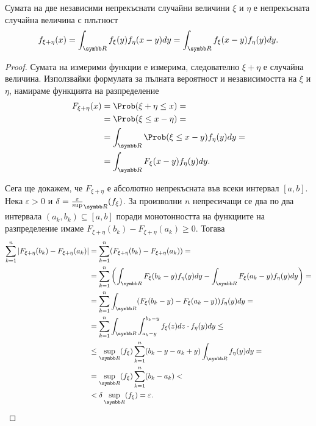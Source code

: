 \documentclass[
  headings=standardclasses,
  bibliography=totocnumbered,
]{scrartcl}
\begin{document}
\begin{proposition}\label{thm:density_of_sum_is_convolution}
  Сумата на две независими непрекъснати случайни величини \( \xi \) и \( \eta \) е непрекъсната случайна величина с плътност
  \begin{equation*}
    f_{\xi + \eta} (x)
    =
    \int_{\R} f_\xi(y) f_\eta(x - y) dy
    =
    \int_{\R} f_\xi(x - y) f_\eta(y) dy.
  \end{equation*}
\end{proposition}
\begin{proof} Сумата на измерими функции е измерима, следователно \( \xi + \eta \) е случайна величина. Използвайки формулата за пълната вероятност и независимостта на \( \xi \) и \( \eta \), намираме функцията на разпределение
  \begin{align*}
    F_{\xi + \eta} (x)
    &=
    \Prob(\xi + \eta \leq x)
    = \\ &=
    \Prob(\xi \leq x - \eta)
    = \\ &=
    \int_{\R} \Prob(\xi \leq x - y) f_\eta(y) dy
    = \\ &=
    \int_{\R} F_\xi(x - y) f_\eta(y) dy.
  \end{align*}

  Сега ще докажем, че \( F_{\xi + \eta} \) е абсолютно непрекъсната във всеки интервал \( [a, b] \). Нека \( \varepsilon > 0 \) и \( \delta = \frac \varepsilon \sup_{\R}(f_\xi) \). За произволни \( n \) непресичащи се два по два интервала \( (a_k, b_k) \subseteq [a, b] \) поради монотонността на функциите на разпределение имаме \( F_{\xi+\eta} (b_k) - F_{\xi+\eta}(a_k) \geq 0 \). Тогава
  \begin{align*}
    \sum_{k=1}^n \Abs{F_{\xi+\eta} (b_k) - F_{\xi+\eta}(a_k)}
    &=
    \sum_{k=1}^n (F_{\xi+\eta} (b_k) - F_{\xi+\eta}(a_k))
    = \\ &=
    \sum_{k=1}^n \left(\int_{\R} F_\xi(b_k - y) f_\eta(y) dy - \int_{\R} F_\xi(a_k - y) f_\eta(y) dy \right)
    = \\ &=
    \sum_{k=1}^n \int_{\R} (F_\xi(b_k - y) - F_\xi(a_k - y)) f_\eta(y) dy
    = \\ &=
    \sum_{k=1}^n \int_{\R} \int_{a_k - y}^{b_k - y} f_\xi(z) dz \cdot f_\eta(y) dy
    \leq \\ &\leq
    \sup_{\R}(f_\xi) \sum_{k=1}^n (b_k - y - a_k + y) \int_{\R} f_\eta(y) dy
    = \\ &=
    \sup_{\R}(f_\xi) \sum_{k=1}^n (b_k - a_k)
    < \\ &<
    \delta \sup_{\R}(f_\xi)
    =
    \varepsilon.
  \end{align*}


\end{proof}
\end{document}
